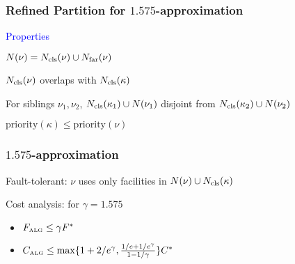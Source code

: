 \documentclass[handout, hyperref, dvipsnames]{beamer}
\begin{document}
\begin{frame}
  \frametitle{Refined Partition for $1.575$-approximation}
  {\Large \textcolor{blue}{
  Properties}}

\vspace{.3in}
  \begin{itemize}\addtolength{\itemsep}{1\baselineskip}
    \large{
  \item $N(\nu)= N_{{\mbox{\scriptsize\rm cls}}}(\nu) \cup N_{{\mbox{\scriptsize\rm far}}}(\nu)$
  \item $N_{{\mbox{\scriptsize\rm cls}}}(\nu)$ overlaps with $N_{{\mbox{\scriptsize\rm cls}}}(\kappa)$
  \item For siblings $\nu_1, \nu_2$, $N_{{\mbox{\scriptsize\rm cls}}}(\kappa_1) \cup
    N(\nu_1)$ disjoint from $N_{{\mbox{\scriptsize\rm cls}}}(\kappa_2) \cup
    N(\nu_2)$
  \item $\text{priority}(\kappa) \leq \text{priority}(\nu)$
}
  \end{itemize}
\end{frame}


\begin{frame}
  \frametitle{$1.575$-approximation}

  \begin{itemize}\addtolength{\itemsep}{1\baselineskip}
    \large{
  \item Fault-tolerant: $\nu$ uses only facilities in
    $N(\nu) \cup N_{{\mbox{\scriptsize\rm cls}}}(\kappa)$
  \item Cost analysis: for $\gamma = 1.575$
    \begin{itemize}
    \item $F_{\mbox{\tiny\rm ALG}} \leq \gamma F^\ast$
    \item $C_{\mbox{\tiny\rm ALG}} \leq \max\{1+2/e^\gamma, \frac{1/e+1/e^\gamma}{1-1/\gamma}\} C^\ast$
    \end{itemize}
}
  \end{itemize}


\end{frame}
\end{document}
